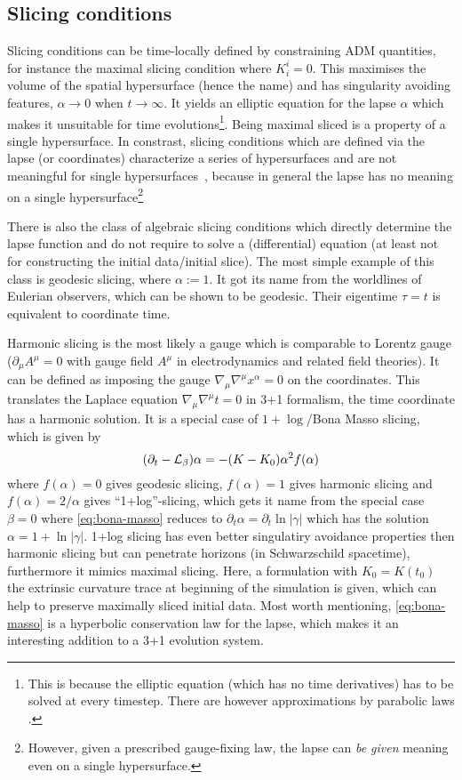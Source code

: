 \subsection*{Slicing conditions}
Slicing conditions can be time-locally defined by constraining ADM quantities,
for instance the maximal slicing condition where $K^i_i = 0$. This maximises
the volume of the spatial hypersurface (hence the name) and has singularity
avoiding features, \ie $\alpha\to0$ when $t \to \infty$. It yields an
elliptic equation for the lapse $\alpha$ which makes it unsuitable for
time evolutions\footnote{This is because the elliptic equation 
	(which has no time derivatives) has to be solved at every timestep.
	There are however approximations by parabolic laws
	\cite{Shibata99a,Shibata_book:2016}.
}. Being maximal sliced is a property of a single hypersurface. In constrast,
slicing conditions which are defined via the lapse (or coordinates)
characterize a series of hypersurfaces and are not meaningful for single
hypersurfaces~\cite{Gourgoulhon2012}, because in general the lapse has no
meaning on a single hypersurface\footnote{However, given a prescribed
	gauge-fixing law, the lapse can \emph{be given} meaning even on a single
	hypersurface.
}

There is also the class of algebraic slicing conditions which directly determine
the lapse function and do not require to solve a (differential) equation
(at least not for constructing the initial data/initial slice). The most
simple example of this class is geodesic slicing, where $\alpha:=1$.
It got its name from the worldlines of Eulerian observers, which can be shown
to be geodesic. Their eigentime $\tau=t$ is equivalent to coordinate time.

Harmonic slicing is the most likely a gauge which is comparable to
Lorentz gauge ($\partial_\mu A^\mu=0$ with gauge field $A^\mu$ in 
electrodynamics and related field theories). It can be defined as imposing
the gauge $\nabla_\mu \nabla^\mu x^\alpha = 0$ on the coordinates. This
translates the Laplace equation $\nabla_\mu \nabla^\mu t=0$ in 3+1 formalism,
\ie the time coordinate has a harmonic solution. It is a special
case of $1+\log$/Bona Masso slicing, which is given by 
\cite{Bona95b}
\begin{equation}\label{eq:bona-masso}
(\partial_t - \mathcal{L}_\beta) \alpha = -(K-K_0) \alpha^2 f(\alpha)
\end{equation}
where $f(\alpha)=0$ gives geodesic slicing, $f(\alpha)=1$ gives harmonic
slicing and $f(\alpha)=2/\alpha$ gives ``1+log''-slicing, which gets it
name from the special case $\beta=0$ where \eqref{eq:bona-masso} reduces
to $\partial_t \alpha=\partial_t \ln |\gamma|$ which has the solution
$\alpha=1+\ln |\gamma|$. 1+log slicing has even better singulatiry avoidance
properties then harmonic slicing but can penetrate horizons (in Schwarzschild
spacetime), furthermore it mimics maximal slicing. Here, a
formulation with $K_0=K(t_0)$ the extrinsic curvature trace at beginning of the
simulation is given, which can help to preserve maximally sliced initial
data. Most worth mentioning, \eqref{eq:bona-masso} is a hyperbolic
conservation law for the lapse, which makes it an interesting addition to
a 3+1 evolution system.

